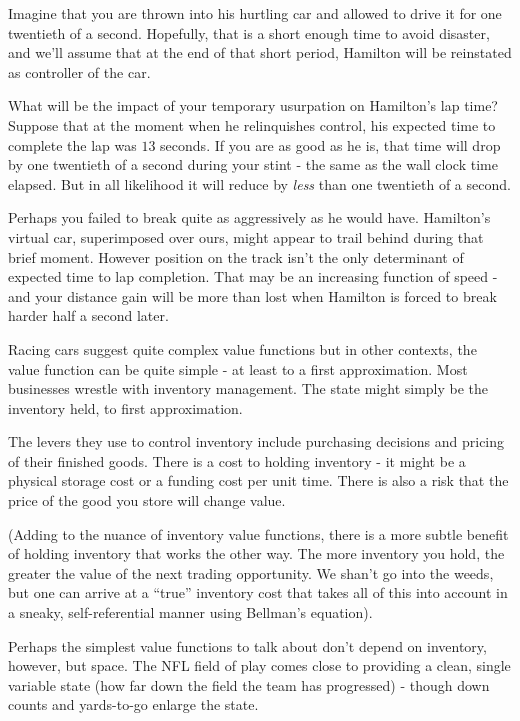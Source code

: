 Imagine that you are thrown into his hurtling car and allowed to drive it for one twentieth of a second. Hopefully, that is a short enough time to avoid disaster, and we'll assume that at the end of that short period, Hamilton will be reinstated as controller of the car. 

What will be the impact of your temporary usurpation on Hamilton's lap time? Suppose that at the moment when he relinquishes control, his expected time to complete the lap was $13$ seconds. If you are as good as he is, that time will drop by one twentieth of a second during your stint - the same as the wall clock time elapsed. But in all likelihood it will reduce by {\em less} than one twentieth of a second.  

Perhaps you failed to break quite as aggressively as he would have. Hamilton's virtual car, superimposed over ours, might appear to trail behind during that brief moment. However position on the track isn't the only determinant of expected time to lap completion. That may be an increasing function of speed - and your distance gain will be more than lost when Hamilton is forced to break harder half a second later.     

Racing cars suggest quite complex value functions but in other contexts, the value function can be quite simple - at least to a first approximation. Most businesses wrestle with inventory management. The state might simply be the inventory held, to first approximation. 


The levers they use to control inventory include purchasing decisions and pricing of their finished goods. There is a cost to holding inventory - it might be a physical storage cost or a funding cost per unit time. There is also a risk that the price of the good you store will change value. 

(Adding to the nuance of inventory value functions, there is a more subtle benefit of holding inventory that works the other way. The more inventory you hold, the greater the value of the next trading opportunity. We shan't go into the weeds, but one can arrive at a ``true'' inventory cost that takes all of this into account in a sneaky, self-referential manner using Bellman's equation). 

Perhaps the simplest value functions to talk about don't depend on inventory, however, but space. The NFL field of play comes close to providing a clean, single variable state (how far down the field the team has progressed) - though down counts and yards-to-go enlarge the state. 

